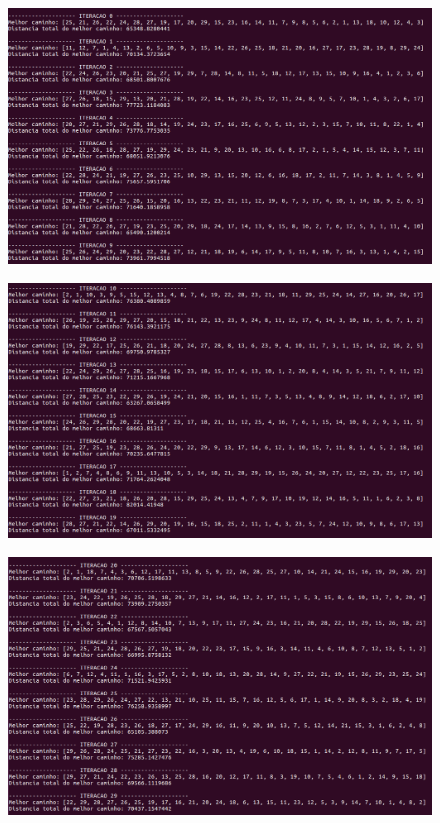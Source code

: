 \documentclass[hidelinks,12pt]{article}
\begin{document}
		\newpage 	

		\begin{figure}[!h]
			\centering
			\includegraphics[scale=0.4]{Figures/m29-1-1.png}
		\end{figure}

		\newpage

		\begin{figure}[!h]
			\centering
			\includegraphics[scale=0.4]{Figures/m29-1-2.png}
		\end{figure}

		\newpage

		\begin{figure}[!h]
			\centering
			\includegraphics[scale=0.4]{Figures/m29-1-3.png}
		\end{figure}
\end{document}
